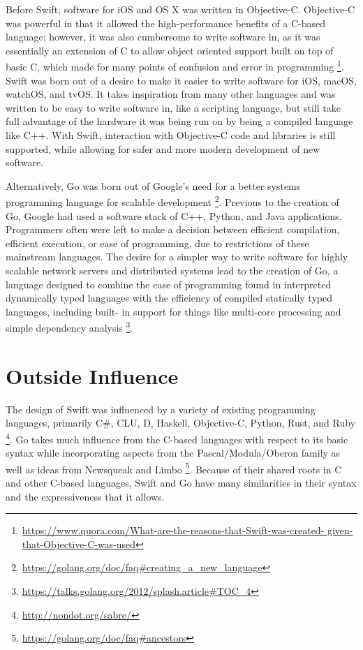 \documentclass[letterpaper]{article}
\begin{document}
Before Swift, software for iOS and OS X was written in Objective-C. Objective-C was powerful in that it allowed the high-performance benefits of a C-based language; however, it was also cumbersome to write software in, as it was essentially an extension of C to allow object oriented support built on top of basic C, which made for many points of confusion and error in programming \footnote{\url{https://www.quora.com/What-are-the-reasons-that-Swift-was-created-
given-that-Objective-C-was-used}}. Swift was born out of a desire to make it easier to write software for iOS, macOS, watchOS, and tvOS. It takes inspiration from many other languages and was written to be easy to write software in, like a scripting language, but still take full advantage of the hardware it was being run on by being a compiled language like C++. With Swift, interaction with Objective-C code and libraries is still supported, while allowing for safer and more modern development of new software.

Alternatively, Go was born out of Google's need for a better systems programming language for scalable development \footnote{\url{https://golang.org/doc/faq#creating_a_new_language}}. Previous to the creation of Go, Google had used a software stack of C++, Python, and Java applications. Programmers often were left to make a decision between efficient compilation, efficient execution, or ease of programming, due to restrictions of these mainstream languages. The desire for a simpler way to write software for highly scalable network servers and distributed systems lead to the creation of Go, a language designed to combine the ease of programming found in interpreted dynamically typed languages with the efficiency of compiled statically typed languages, including built- in support for things like multi-core processing and simple dependency analysis \footnote{\url{https://talks.golang.org/2012/splash.article#TOC_4}}.

\section{Outside Influence}

The design of Swift was influenced by a variety of existing programming languages, primarily C\#, CLU, D, Haskell, Objective-C, Python, Rust, and Ruby \footnote{\url{http://nondot.org/sabre/}}. Go takes much influence from the C-based languages with respect to its basic syntax while incorporating aspects from the Pascal/Modula/Oberon family as well as ideas from Newsqueak and Limbo \footnote{\url{https://golang.org/doc/faq#ancestors}}. Because of their shared roots in C and other C-based languages, Swift and Go have many similarities in their syntax and the expressiveness that it allows.
\end{document}
